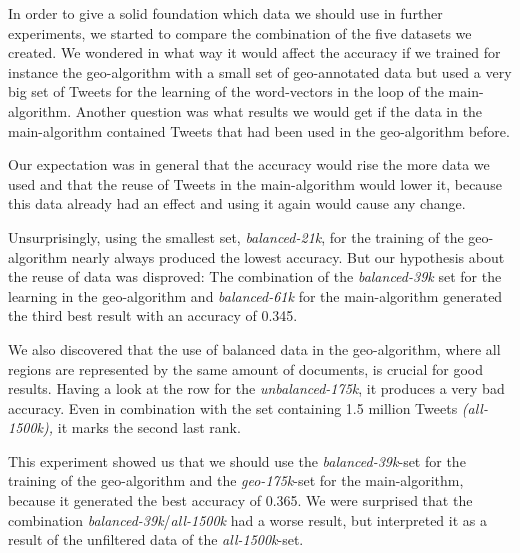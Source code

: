 \documentclass[../Main.tex]{subfiles}
\begin{document}
In order to give a solid foundation which data we should use in further experiments, we started to compare the combination of the five datasets we created. We wondered in what way it would affect the accuracy if we trained for instance the geo-algorithm with a small set of geo-annotated data but used a very big set of Tweets for the learning of the word-vectors in the loop of the main-algorithm. Another question was what results we would get if the data in the main-algorithm contained Tweets that had been used in the geo-algorithm before. 

Our expectation was in general that the accuracy would rise the more data we used and that the reuse of Tweets in the main-algorithm would lower it, because this data already had an effect and using it again would cause any change.

Unsurprisingly, using the smallest set, \emph{balanced-21k}, for the training of the geo-algorithm nearly always produced the lowest accuracy. 
But our hypothesis about the reuse of data was disproved: The combination of the \emph{balanced-39k} set for the learning in the geo-algorithm and \emph{balanced-61k} for the main-algorithm generated the third best result with an accuracy of 0.345.

We also discovered that the use of balanced data in the geo-algorithm, where all regions are represented by the same amount of documents, is crucial for good results. Having a look at the row for the \emph{unbalanced-175k}, it produces a very bad accuracy. Even in combination with the set containing 1.5 million Tweets \emph{(all-1500k),} it marks the second last rank.

This experiment showed us that we should use the \emph{balanced-39k}-set for the training of the geo-algorithm and the \emph{geo-175k}-set for the main-algorithm, because it generated the best accuracy of 0.365. We were surprised that the combination \emph{balanced-39k}/\emph{all-1500k} had a worse result, but interpreted it as a result of the unfiltered data of the \emph{all-1500k}-set.
\end{document}
